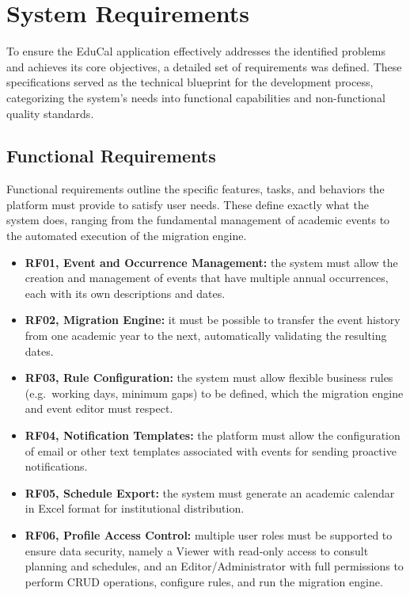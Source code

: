 \section{System Requirements} \label{sec:requirements}

To ensure the EduCal application effectively addresses the identified problems and achieves its core objectives, a detailed set of requirements was defined. These specifications served as the technical blueprint for the development process, categorizing the system's needs into functional capabilities and non-functional quality standards.

\subsection{Functional Requirements} \label{sec:functional-requirements}

Functional requirements outline the specific features, tasks, and behaviors the platform must provide to satisfy user needs. These define exactly what the system does, ranging from the fundamental management of academic events to the automated execution of the migration engine.

\begin{itemize}
    \item \textbf{RF01, Event and Occurrence Management:} the system must allow the creation and management of events that have multiple annual occurrences, each with its own descriptions and dates.
    \item \textbf{RF02, Migration Engine:} it must be possible to transfer the event history from one academic year to the next, automatically validating the resulting dates.
    \item \textbf{RF03, Rule Configuration:} the system must allow flexible business rules (e.g.\ working days, minimum gaps) to be defined, which the migration engine and event editor must respect.
    \item \textbf{RF04, Notification Templates:} the platform must allow the configuration of email or other text templates associated with events for sending proactive notifications.
    \item \textbf{RF05, Schedule Export:} the system must generate an academic calendar in Excel format for institutional distribution.
    \item \textbf{RF06, Profile Access Control:} multiple user roles must be supported to ensure data security, namely a Viewer with read-only access to consult planning and schedules, and an Editor/Administrator with full permissions to perform CRUD operations, configure rules, and run the migration engine.
\end{itemize}

